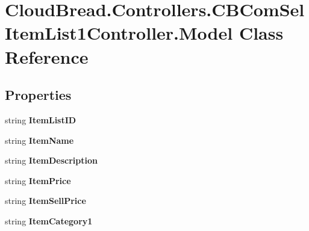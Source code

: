 \hypertarget{a00149}{}\section{Cloud\+Bread.\+Controllers.\+C\+B\+Com\+Sel\+Item\+List1\+Controller.\+Model Class Reference}
\label{a00149}
\subsection*{Properties}
\begin{DoxyCompactItemize}
\item 
string {\bfseries Item\+List\+ID}\hypertarget{a00149_a8261b558b5fd2adc27fcc3113247d7c3}{}\label{a00149_a8261b558b5fd2adc27fcc3113247d7c3}

\item 
string {\bfseries Item\+Name}\hypertarget{a00149_af6d172fb00e7a1ea505ec6c5e14408ca}{}\label{a00149_af6d172fb00e7a1ea505ec6c5e14408ca}

\item 
string {\bfseries Item\+Description}\hypertarget{a00149_ae5786e2691d43829644fcba7d9d99038}{}\label{a00149_ae5786e2691d43829644fcba7d9d99038}

\item 
string {\bfseries Item\+Price}\hypertarget{a00149_aeacba16b5783de26a3fcd8ae3af857a7}{}\label{a00149_aeacba16b5783de26a3fcd8ae3af857a7}

\item 
string {\bfseries Item\+Sell\+Price}\hypertarget{a00149_a63840c7096b71b9b8085a0322f8799b3}{}\label{a00149_a63840c7096b71b9b8085a0322f8799b3}

\item 
string {\bfseries Item\+Category1}\hypertarget{a00149_ab2756b8dde0886e13b70eb7c95af571b}{}\label{a00149_ab2756b8dde0886e13b70eb7c95af571b}


\end{DoxyCompactItemize}
